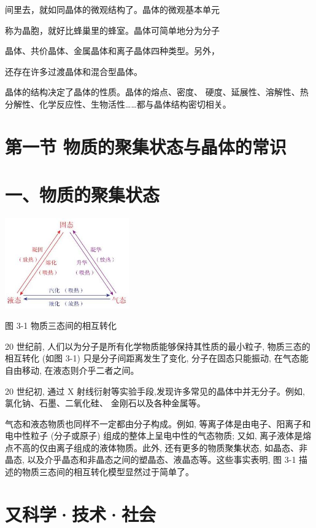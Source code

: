 \documentclass[10pt]{article}
\begin{document}
间里去，就如同晶体的微观结构了。晶体的微观基本单元

称为晶胞，就好比蜂巢里的蜂室。晶体可简单地分为分子

晶体、共价晶体、金属晶体和离子晶体四种类型。另外，

还存在许多过渡晶体和混合型晶体。

晶体的结构决定了晶体的性质。晶体的熔点、密度、 硬度、延展性、溶解性、热分解性、化学反应性、生物活性……都与晶体结构密切相关。

\section*{第一节 物质的聚集状态与晶体的常识}

\section*{一、物质的聚集状态}

\begin{center}
\includegraphics[max width=0.4\textwidth]{images/0190e026-5a11-7df7-bd27-54d09026ba7a_71_238373.jpg}
\end{center}

图 3-1 物质三态间的相互转化

20 世纪前, 人们以为分子是所有化学物质能够保持其性质的最小粒子, 物质三态的相互转化 (如图 3-1) 只是分子间距离发生了变化, 分子在固态只能振动, 在气态能自由移动, 在液态则介乎二者之间。

20 世纪初, 通过 \(\mathrm{X}\) 射线衍射等实验手段,发现许多常见的晶体中并无分子。例如, 氯化钠、石墨、二氧化硅、 金刚石以及各种金属等。

气态和液态物质也同样不一定都由分子构成。例如, 等离子体是由电子、阳离子和电中性粒子 (分子或原子) 组成的整体上呈电中性的气态物质; 又如, 离子液体是熔点不高的仅由离子组成的液体物质。此外, 还有更多的物质聚集状态, 如晶态、非晶态, 以及介乎晶态和非晶态之间的塑晶态、液晶态等。这些事实表明, 图 3-1 描述的物质三态间的相互转化模型显然过于简单了。

\section*{又科学·技术·社会}
\end{document}
